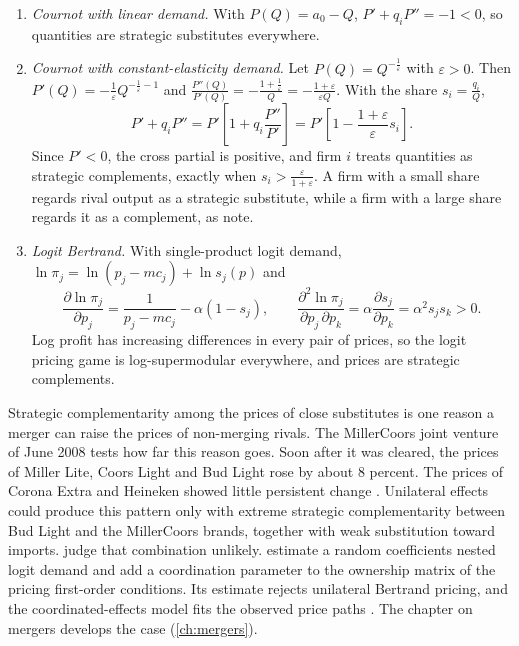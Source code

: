 \begin{example}\label{ex:B-strategic-examples}
\leavevmode
\begin{enumerate}[label=(\alph*)]
  \item \emph{Cournot with linear demand.} With $P(Q) = a_0 - Q$, $P' + q_iP'' = -1 < 0$, so quantities are strategic
  substitutes everywhere.
  \item \emph{Cournot with constant-elasticity demand.} Let $P(Q) = Q^{-\frac{1}{\varepsilon}}$ with $\varepsilon > 0$. Then
  $P'(Q) = -\frac{1}{\varepsilon}Q^{-\frac{1}{\varepsilon} - 1}$ and $\frac{P''(Q)}{P'(Q)} = -\frac{1 + \frac{1}{\varepsilon}}{Q} = -\frac{1 + \varepsilon}{\varepsilon Q}$.
  With the share $s_i = \frac{q_i}{Q}$,
  \[
    P' + q_iP'' = P'\left[1 + q_i\frac{P''}{P'}\right] = P'\left[1 - \frac{1 + \varepsilon}{\varepsilon}s_i\right].
  \]
  Since $P' < 0$, the cross partial is positive, and firm $i$ treats quantities as strategic complements, exactly
  when $s_i > \frac{\varepsilon}{1 + \varepsilon}$. A firm with a small share regards rival output as a strategic
  substitute, while a firm with a large share regards it as a complement, as
  \citet[p.~494]{BulowGeanakoplosKlemperer1985} note.
  \item \emph{Logit Bertrand.} With single-product logit demand, $\ln\pi_j = \ln(p_j - mc_j) + \ln s_j(p)$ and
  \[
    \frac{\partial\ln\pi_j}{\partial p_j} = \frac{1}{p_j - mc_j} - \alpha(1 - s_j),
    \qquad
    \frac{\partial^2\ln\pi_j}{\partial p_j\,\partial p_k} = \alpha\frac{\partial s_j}{\partial p_k} = \alpha^2s_js_k > 0.
  \]
  Log profit has increasing differences in every pair of prices, so the logit pricing game is log-supermodular
  everywhere, and prices are strategic complements.
\end{enumerate}
Strategic complementarity among the prices of close substitutes is one reason a merger can raise the prices of
non-merging rivals. The MillerCoors joint venture of June 2008 tests how far this reason goes. Soon after it was
cleared, the prices of Miller Lite, Coors Light and Bud Light rose by about 8 percent. The prices of Corona Extra
and Heineken showed little persistent change \citep[pp.~241--242]{AskerNocke2021}. Unilateral effects could
produce this pattern only with extreme strategic complementarity between Bud Light and the MillerCoors brands,
together with weak substitution toward imports. \citet[p.~242]{AskerNocke2021} judge that combination unlikely.
\citet{MillerWeinberg2017} estimate a random coefficients nested logit demand and add a coordination parameter to
the ownership matrix of the pricing first-order conditions. Its estimate rejects unilateral Bertrand pricing, and
the coordinated-effects model fits the observed price paths \citep[p.~242 and fn.~164]{AskerNocke2021}. The
chapter on mergers develops the case (\cref{ch:mergers}).
\end{example}


